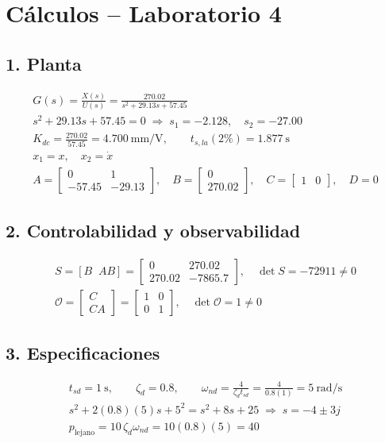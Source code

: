 \documentclass[11pt]{article}
\begin{document}
\section*{Cálculos -- Laboratorio 4}

\subsection*{1. Planta}
\begin{gather*}
G(s)=\frac{X(s)}{U(s)}=\frac{270.02}{s^2+29.13s+57.45}\\
s^2+29.13s+57.45=0 \;\Rightarrow\; s_1=-2.128,\quad s_2=-27.00\\
K_{dc}=\frac{270.02}{57.45}=4.700~\text{mm/V},\qquad t_{s,la}(2\%)=1.877~\text{s}\\
x_1=x,\quad x_2=\dot{x}\\
A=\begin{bmatrix}0&1\\-57.45&-29.13\end{bmatrix},\quad
B=\begin{bmatrix}0\\270.02\end{bmatrix},\quad
C=\begin{bmatrix}1&0\end{bmatrix},\quad D=0
\end{gather*}
\subsection*{2. Controlabilidad y observabilidad}
\begin{gather*}
S=[B\;\;AB]=\begin{bmatrix}0 & 270.02 \\ 270.02 & -7865.7\end{bmatrix},\quad \det S=-72911\neq0\\
\mathcal{O}=\begin{bmatrix}C\\CA\end{bmatrix}=\begin{bmatrix}1 & 0 \\ 0 & 1\end{bmatrix},\quad \det\mathcal{O}=1\neq0
\end{gather*}
\subsection*{3. Especificaciones}
\begin{gather*}
t_{sd}=1~\text{s},\qquad \zeta_d=0.8,\qquad \omega_{nd}=\frac{4}{\zeta_d t_{sd}}=\frac{4}{0.8(1)}=5~\text{rad/s}\\
s^2+2(0.8)(5)s+5^2=s^2+8s+25 \;\Rightarrow\; s=-4\pm3j\\
p_{\text{lejano}}=10\,\zeta_d\omega_{nd}=10(0.8)(5)=40
\end{gather*}
\end{document}
